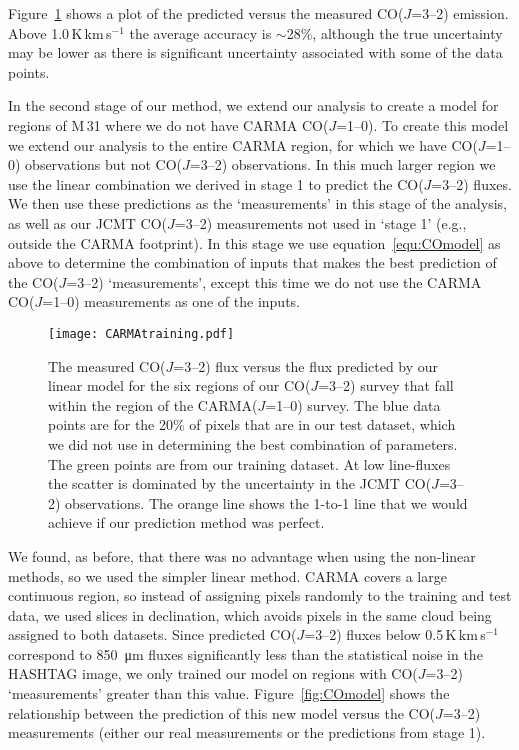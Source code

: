 \documentclass[a4paper,fleqn,usenatbib, twocolumn]{aastex63}
\begin{document}
Figure~\ref{fig:CARMAtraining} shows a plot of the predicted versus the measured CO($J$=3--2) emission. Above 1.0\,K\,km\,s$^{-1}$ the average accuracy is $\sim$28\%,
although the true uncertainty may be lower as there is significant uncertainty associated with some of the data points.



In the second stage of our method, we extend our analysis to create a model for regions of M\,31 where
we do not have CARMA CO($J$=1--0). To create this model we extend our analysis to the entire CARMA region, for which
we have CO($J$=1--0) observations but not CO($J$=3--2)
observations. In this much larger region we use the linear combination we derived in
stage 1 to predict the CO($J$=3--2) fluxes. We then use
these predictions as the `measurements' in this stage
of the analysis, as well as our JCMT CO($J$=3--2) measurements not used in `stage 1' (e.g., outside the CARMA footprint). 
In this stage we use equation~\ref{equ:COmodel} as above to determine the combination of inputs that makes
the best prediction of the CO($J$=3--2) `measurements', except
this time we do not use the CARMA CO($J$=1--0) measurements as one of the inputs.

\begin{figure}
  \centering
  \texttt{[image: CARMAtraining.pdf]}
  \caption{The measured CO($J$=3--2) flux versus the
  flux predicted by our linear model for the
  six regions of our CO($J$=3--2) survey that fall within
  the region of the CARMA($J$=1--0) survey. The blue data points are for the 20\% of pixels that
  are in our test dataset, which we did not use in determining the best combination of parameters. The green points are from our training dataset. At low line-fluxes the scatter is dominated by the uncertainty in the JCMT CO($J$=3--2) observations.
  The orange  line shows the 1-to-1 line that we would achieve if our prediction method was perfect.
  }
  \label{fig:CARMAtraining}
\end{figure}

We found, as before, that there was no advantage when using the non-linear methods, so we used the simpler linear
method. CARMA covers a large continuous region, 
so instead of assigning pixels randomly to the
training and test data, we used slices in declination,
which avoids pixels in the same cloud being assigned
to both datasets. Since predicted
CO($J$=3--2) fluxes below 0.5\,K\,km\,s$^{-1}$ correspond
to \SI{850}{\micro\meter} fluxes significantly less than
the statistical noise in the HASHTAG image,
we only trained our model on regions with
CO($J$=3--2) `measurements' greater than this value.
Figure~\ref{fig:COmodel} shows the relationship between
the prediction of this new model versus the CO($J$=3--2)
measurements (either our real measurements or
the predictions from stage 1).
\end{document}
